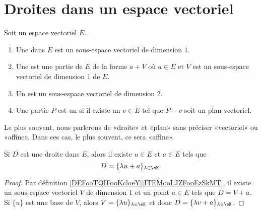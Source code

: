 

\section{Droites dans un espace vectoriel}


\begin{definition}      \label{DEFooTQIFooKcloeY}
	Soit un espace vectoriel \( E\).
	\begin{enumerate}
		\item
		      Une  dans \( E\) est un sous-espace vectoriel de dimension \( 1\).
		\item		\label{ITEMooLJZFooEzSkMT}
		      Une  est une partie de \( E\) de la forme \( a+V\) où \( a\in E\) et \( V\) est un sous-espace vectoriel de dimension \( 1\) de \( E\).
		\item
		      Un  est un sous-espace vectoriel de dimension \( 2\).
		\item		\label{ITEMooQNAYooZymIqK}
		      Une partie \( P\) est un  si il existe un \( v\in E\) tel que \( P-v\) soit un plan vectoriel.
	\end{enumerate}
	Le plus souvent, nous parlerons de «droite» et «plan» sans préciser «vectoriel» ou «affine». Dans ces cas, le plus souvent, ce sera «affine».
\end{definition}


\begin{proposition}	\label{PROPooQTZYooYWmnlu}
	Si \( D\) est une droite dans \( E\), alors il existe \( u\in E\) et \( a\in E\) tels que
	\begin{equation}
		D=\{ \lambda u+a \}_{\lambda\in \eK}.
	\end{equation}
\end{proposition}

\begin{proof}
	Par définition \ref{DEFooTQIFooKcloeY}\ref{ITEMooLJZFooEzSkMT}, il existe un sous-espace vectoriel \( V\) de dimension  \( 1\) et un point \( a\in E\) tels que \( D=V+a\). Si \( \{ u \}\) est une base de \( V\), alors \( V=\{ \lambda u \}_{\lambda\in \eK}\) et donc \( D=\{ \lambda v+a \}_{\lambda\in \eK}\).
\end{proof}

